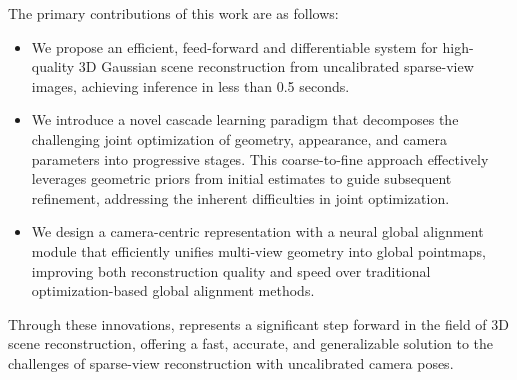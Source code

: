 The primary contributions of this work are as follows:
\begin{itemize}
\item We propose an efficient, feed-forward and differentiable system for high-quality 3D Gaussian scene reconstruction from uncalibrated sparse-view images, achieving inference in less than 0.5 seconds.
\item We introduce a novel cascade learning paradigm that decomposes the challenging joint optimization of geometry, appearance, and camera parameters into progressive stages. This coarse-to-fine approach effectively leverages geometric priors from initial estimates to guide subsequent refinement, addressing the inherent difficulties in joint optimization.
\item We design a camera-centric representation with a neural global alignment module that efficiently unifies multi-view geometry into global pointmaps, improving both reconstruction quality and speed over traditional optimization-based global alignment methods.
\end{itemize}

Through these innovations, \method represents a significant step forward in the field of 3D scene reconstruction, offering a fast, accurate, and generalizable solution to the challenges of sparse-view reconstruction with uncalibrated camera poses.



